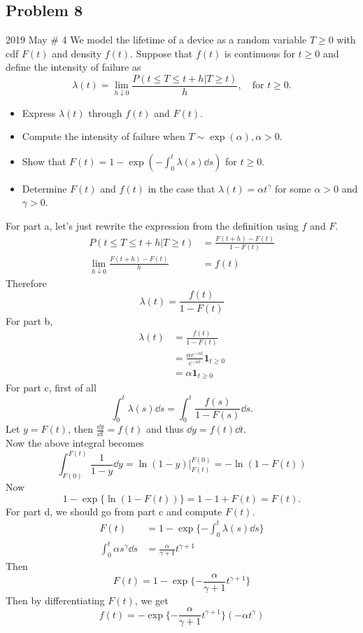 \documentclass[../main]{subfiles}
\begin{document}
\subsection{Problem 8}
\begin{bbox}{2019 May \# 4}
    We model the lifetime of a device as a random variable $T\ge 0$ with cdf $F(t)$ and density $f(t)$. Suppose that $f(t)$ is continuous for $t\ge 0$ and define the intensity of failure as 
    \[
    \lambda(t) = \lim_{h\downarrow0} \frac{P(t\le T \le t+h|T\ge t)}{h}, \quad \text{for $t\ge 0$.}
    \]
    \begin{itemize}
        \item Express $\lambda(t)$ through $f(t)$ and $F(t)$.
        \item Compute the intensity of failure when $T\sim \exp(\alpha),\alpha>0$.
        \item Show that $F(t) = 1-\exp(-\int_{0}^{t}\lambda(s)\dd s)$ for $t\ge 0$.
        \item Determine $F(t)$ and $f(t)$ in the case that $\lambda(t) = \alpha t^{\gamma}$ for some $\alpha>0$ and $\gamma > 0$.
    \end{itemize}
\end{bbox}
\begin{solution}
    For part a, let's just rewrite the expression from the definition using $f$ and $F$. 
    \begin{align*}
        P(t\le T\le t+h | T\ge t) &= \frac{F(t+h)-F(t)}{1-F(t)}\\
        \lim_{h\downarrow 0} \frac{F(t+h)-F(t)}{h}&= f(t)
    \end{align*}
    Therefore 
    \[
    \lambda(t) = \frac{f(t)}{1-F(t) }
    \]
    For part b, 
    \begin{align*}
        \lambda(t) &= \frac{f(t)}{1-F(t)}\\
        &= \frac{\alpha e^{-\alpha t}}{e^{-\alpha t}} \mathbf{1}_{t\ge 0}\\
        &= \alpha \mathbf{1}_{t\ge 0}
    \end{align*}
    For part c, first of all
    \[
    \int_{0}^t \lambda(s)\dd s = \int_{0}^{t} \frac{f(s)}{1-F(s)}\dd s.
    \]
    Let $y=F(t)$, then $\frac{\dd y}{\dd t} = f(t)$ and thus $\dd y = f(t)\dd t$.\\
    Now the above integral becomes 
    \[
    \int_{F(0)}^{F(t)}\frac{1}{1-y}\dd y = \left. \ln (1-y) \right |_{F(t)}^{F(0)} = -\ln (1-F(t))
    \]
    Now 
    \[
    1- \exp\{\ln(1-F(t))\} = 1 -1+F(t) = F(t).
    \]
    For part d, we should go from part c and compute $F(t)$. 
    \begin{align*}
        F(t) &= 1-\exp\{-\int_{0}^t\lambda(s)\dd s\}\\
        \int_{0}^t\alpha s^{\gamma} \dd s &= \frac{\alpha}{\gamma + 1}t^{\gamma + 1}
    \end{align*}
    Then 
    \[
    F(t) = 1 - \exp\{-\frac{\alpha}{\gamma + 1} t^{\gamma + 1}\}
    \]
    Then by differentiating $F(t)$, we get 
    \[
    f(t) = -\exp\{-\frac{\alpha}{\gamma + 1}t^{\gamma + 1}\} (-\alpha t^\gamma)
    \]
\end{solution}
\end{document}
